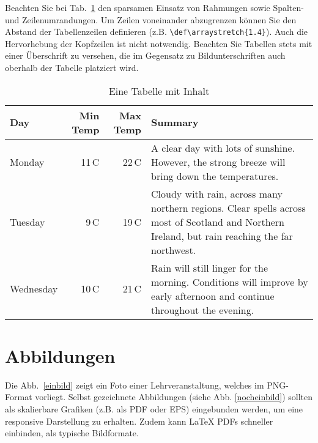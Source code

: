 \documentclass[twoside,bibliography=totoc,openany]{fumi}
\begin{document}
Beachten Sie bei Tab.~\ref{Tabellenbeispiel} den sparsamen Einsatz von Rahmungen sowie Spalten- und Zeilenumrandungen. Um Zeilen voneinander abzugrenzen können Sie den Abstand der Tabellenzeilen definieren (z.B. \verb|\def\arraystretch{1.4}|).
Auch die Hervorhebung der Kopfzeilen ist nicht notwendig. Beachten Sie Tabellen stets mit einer Überschrift zu versehen, die im Gegensatz zu Bildunterschriften auch oberhalb der Tabelle platziert wird.

\begin{table}[!ht]
\def\arraystretch{1.4}
\label{Tabellenbeispiel}
\caption{Eine Tabelle mit Inhalt}
 \begin{tabularx}{\textwidth}{lrrX}      
    \hline
    Day & Min Temp & Max Temp & Summary 
    \\\hline
    Monday & 11\,C & 22\,C & A clear day with lots of sunshine.
    However, the strong breeze will bring down the temperatures. \\
    Tuesday & 9\,C & 19\,C & Cloudy with rain, across many northern regions. Clear spells 
    across most of Scotland and Northern Ireland, 
    but rain reaching the far northwest. \\
    Wednesday & 10\,C & 21\,C & Rain will still linger for the morning. 
    Conditions will improve by early afternoon and continue 
    throughout the evening. \\
    \hline
    \end{tabularx}
\end{table}



\section{Abbildungen}

Die Abb.~\ref{einbild} zeigt ein Foto einer Lehrveranstaltung, welches im PNG-Format vorliegt. Selbst gezeichnete Abbildungen (siehe Abb. \ref{nocheinbild}) sollten als skalierbare Grafiken (z.B. als PDF oder EPS) eingebunden werden, um eine responsive Darstellung zu erhalten. Zudem kann LaTeX PDFs schneller einbinden, als typische Bildformate.
\end{document}
